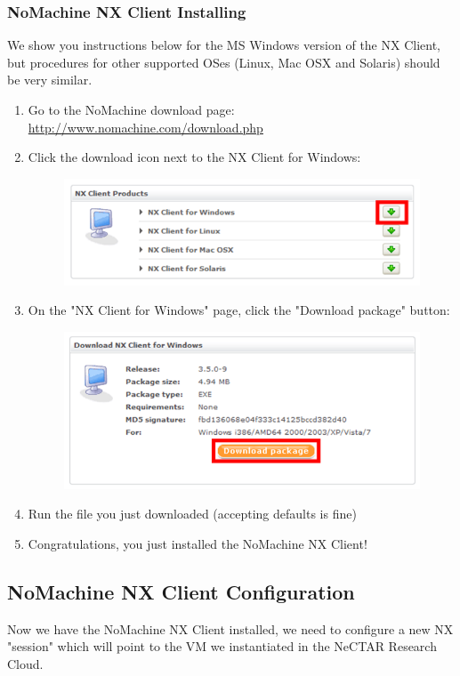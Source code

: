 \subsubsection{NoMachine NX Client Installing}
We show you instructions below for the MS Windows version of the NX Client, but
procedures for other supported OSes (Linux, Mac OSX and Solaris) should be very
similar.
\begin{enumerate}
  \item Go to the NoMachine download page: \url{http://www.nomachine.com/download.php}
  \item Click the download icon next to the NX Client for Windows:
  \begin{figure}[H]
    \centering
    \includegraphics[scale=0.5]{post-workshop/nx_client/download.png}
    \label{fig:nx_download}
  \end{figure}
  \item On the "NX Client for Windows" page, click the "Download package" button:
  \begin{figure}[H]
    \centering
    \includegraphics[scale=0.5]{post-workshop/nx_client/download_package.png}
    \label{fig:nx_download_package}
  \end{figure}
  \item Run the file you just downloaded (accepting defaults is fine)
  \item Congratulations, you just installed the NoMachine NX Client!
\end{enumerate}

\subsection{NoMachine NX Client Configuration}
Now we have the NoMachine NX Client installed, we need to configure a new NX
"session" which will point to the VM we instantiated in the NeCTAR Research
Cloud.

